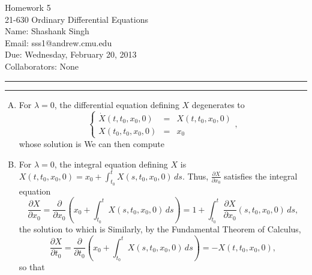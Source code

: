 \documentclass[11pt]{article}
\makeatletter
\newcounter{questionCounter}
\newcounter{partCounter}[questionCounter]
\newenvironment{question}[2][\arabic{questionCounter}]{%
    \setcounter{partCounter}{0}%
    \vspace{.25in} \hrule \vspace{0.5em}%
        \noindent{\bf #2}%
    \vspace{0.8em} \hrule \vspace{.10in}%
    \addtocounter{questionCounter}{1}%
}{}
\newcommand{\myname}{Shashank Singh}
\newcommand{\myandrew}{sss1@andrew.cmu.edu}
\newcommand{\myclass}{21-630 Ordinary Differential Equations}
\newcommand{\myhwnum}{5}
\newcommand{\duedate}{Wednesday, February 20, 2013}
\newcommand{\mycollaborators}{None}
\makeatother
\begin{document}
\thispagestyle{plain}

{\Large Homework \myhwnum} \\
\myclass \\
Name: \myname \\
Email: \myandrew \\
Due: \duedate \\
Collaborators: \mycollaborators

\begin{question}{Problem 2}
\begin{enumerate}[A)]
\item For $\lambda = 0$, the differential equation defining $X$ degenerates to
\[
    \left\{
        \begin{array}{rcl}
            \dot{X}(t,t_0,x_0,0) & = & X(t,t_0,x_0,0) \\
            X(t_0,t_0,x_0,0)     & = & x_0
        \end{array}
    \right.,
\]
whose solution is  We can then
compute 

\item For $\lambda = 0$, the integral equation defining $X$ is
$X(t,t_0,x_0,0) = x_0 + \int_{t_0}^t X(s,t_0,x_0,0) \, ds$. Thus,
$\frac{\partial X}{\partial x_0}$ satisfies the integral equation
\[
 \frac{\partial X}{\partial x_0}
 = \frac{\partial}{\partial x_0}
                        \left(x_0 + \int_{t_0}^t X(s,t_0,x_0,0) \, ds \right)
 = 1 + \int_{t_0}^t \frac{\partial X}{\partial x_0}(s,t_0,x_0,0) \, ds,
\]
the solution to which is
Similarly, by the Fundamental Theorem of Calculus,
\[
 \frac{\partial X}{\partial t_0}
 = \frac{\partial}{\partial t_0}
                        \left(x_0 + \int_{t_0}^t X(s,t_0,x_0,0) \, ds \right)
 = -X(t,t_0,x_0,0),
\]
so that 


\end{enumerate}
\end{question}
\end{document}
